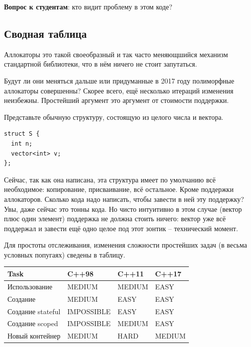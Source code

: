 \documentclass[a4paper,12pt,oneside]{book}
\newif\ifanswers
\begin{document}
\textbf{Вопрос к студентам}: кто видит проблему в этом коде?

\ifanswers
Правильный ответ: разумеется она в безопасности исключений. Конкретно исключение с самыми печальными последствиями может прилететь из \lstinline!construct!
\fi

\subsection{Сводная таблица}\label{sub:taballoc}

Аллокаторы это такой своеобразный и так часто меняющшийся механизм стандартной библиотеки, что в нём ничего не стоит запутаться.

Будут ли они меняться дальше или придуманные в 2017 году полиморфные аллокаторы совершенны? Скорее всего, ещё несколько итераций изменения неизбежны. Простейший аргумент это аргумент от стоимости поддержки.

Представьте обычную структуру, состоящую из целого числа и вектора. 

\begin{lstlisting}
struct S {  
  int n;
  vector<int> v;
}; 
\end{lstlisting}

Сейчас, так как она написана, эта структура имеет по умолчанию всё необходимое: копирование, присваивание, всё остальное. Кроме поддержки аллокаторов. Сколько кода надо написать, чтобы завести в ней эту поддержку? Увы, даже сейчас это тонны кода. Но чисто интуитивно в этом случае (вектор плюс один элемент) поддержка не должна стоить ничего: вектор уже всё поддержал и завести ещё одно целое под этот зонтик -- технический момент.

Для простоты отслеживания, изменения сложности простейших задач (в весьма условных попугаях) сведены в таблицу.

\begin{center}
\begin{tabular}{ | l | l | l | l | }
  \hline
  Task &  C++98 & C++11 & C++17 \\ \hline \hline
  Использование & MEDIUM & MEDIUM & EASY \\ \hline 
  Создание & MEDIUM & EASY & EASY \\ \hline
  Создание stateful &  IMPOSSIBLE & EASY & EASY \\ \hline 
  Создание scoped & IMPOSSIBLE & MEDIUM & EASY \\ \hline
  Новый контейнер & MEDIUM & HARD & MEDIUM \\ \hline
  \hline
\end{tabular}
\end{center}
\end{document}
